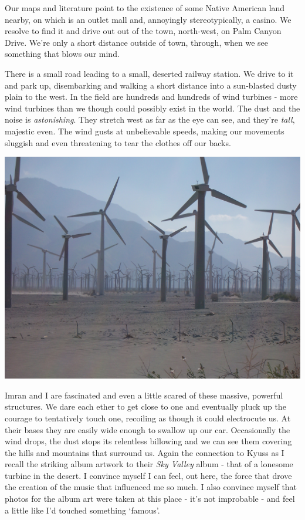 \documentclass[a5paper,titlepage,11pt]{book}
\begin{document}
Our maps and literature point to the existence of some Native American land nearby, on which is an outlet mall and, annoyingly stereotypically, a casino.  We resolve to find it and drive out out of the town, north-west, on Palm Canyon Drive. We're only a short distance outside of town, through, when we see something that blows our mind.

There is a small road leading to a small, deserted railway station.  We drive to it and park up, disembarking and walking a short distance into a sun-blasted dusty plain to the west.  In the field are hundreds and hundreds of wind turbines - more wind turbines than we though could possibly exist in the world.  The dust and the noise is \emph{astonishing}.  They stretch west as far as the eye can see, and they're \emph{tall}, majestic even.  The wind gusts at unbelievable speeds, making our movements sluggish and even threatening to tear the clothes off our backs.

\begin{center}\includegraphics[width=\textwidth]{gfx/100_1636}\end{center}

Imran and I are fascinated and even a little scared of these massive, powerful structures.  We dare each ether to get close to one and eventually pluck up the courage to tentatively touch one, recoiling as though it could electrocute us.  At their bases they are easily wide enough to swallow up our car.  Occasionally the wind drops, the dust stops its relentless billowing and we can see them covering the hills and mountains that surround us.  Again the connection to Kyuss as I recall the striking album artwork to their \emph{Sky Valley} album - that of a lonesome turbine in the desert.  I convince myself I can feel, out here, the force that drove the creation of the music that influenced me so much.  I also convince myself that photos for the album art were taken at this place - it's not improbable - and feel a little like I'd touched something `famous'.
\end{document}
